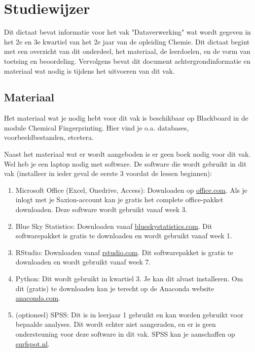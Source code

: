 \chapter{Studiewijzer}

Dit dictaat bevat informatie voor het vak "Dataverwerking" wat wordt gegeven in het 2e en 3e kwartiel van het 2e jaar van de opleiding Chemie. Dit dictaat begint met een overzicht van dit onderdeel, het materiaal, de leerdoelen, en de vorm van toetsing en beoordeling. Vervolgens bevat dit document achtergrondinformatie en materiaal wat nodig is tijdens het uitvoeren van dit vak.


\section{Materiaal}
Het materiaal wat je nodig hebt voor dit vak is beschikbaar op Blackboard in de module Chemical Fingerprinting. Hier vind je o.a. databases, voorbeeldbestanden, etcetera. 

Naast het materiaal wat er wordt aangeboden is er geen boek nodig voor dit vak. Wel heb je een laptop nodig met software. De software die wordt gebruikt in dit vak (installeer in ieder geval de eerste 3 voordat de lessen beginnen):
\begin{enumerate}
    \item Microsoft Office (Excel, Onedrive, Access): Downloaden op \href{https://office.com}{\textsf{office.com}}. Als je inlogt met je Saxion-account kan je gratis het complete office-pakket downloaden. Deze software wordt gebruikt vanaf week 3. 
    \item Blue Sky Statistics: Downloaden vanaf \href{https://www.blueskystatistics.com/}{\textsf{blueskystatistics.com}}. Dit softwarepakket is gratis te downloaden en wordt gebruikt vanaf week 1. 
    \item RStudio: Downloaden vanaf \href{https://rstudio.com/}{\textsf{rstudio.com}}. Dit softwarepakket is gratis te downloaden en wordt gebruikt vanaf week 7.
    \item Python: Dit wordt gebruikt in kwartiel 3. Je kan dit alvast installeren. Om dit (gratis) te downloaden kan je terecht op de Anaconda website \href{https://www.anaconda.com/distribution/}{anaconda.com}.
    \item (optioneel) SPSS: Dit is in leerjaar 1 gebruikt en kan worden gebruikt voor bepaalde analyses. Dit wordt echter niet aangeraden, en er is geen ondersteuning voor deze software in dit vak. SPSS kan je aanschaffen op \href{https://www.surfspot.nl/}{surfspot.nl}.
\end{enumerate}

